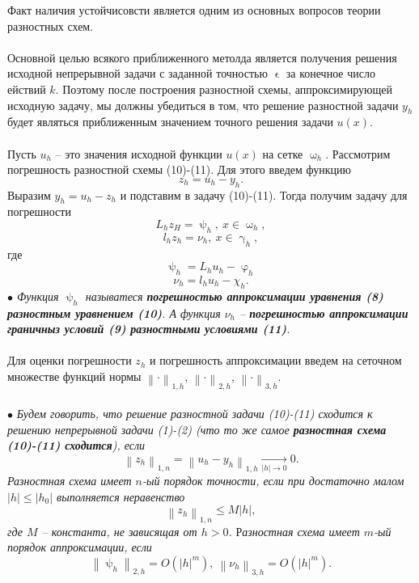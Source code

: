 \documentclass[a4paper, 12pt]{report}
\numberwithin{equation}{section}
\renewcommand{\leq}{\leqslant}
\renewcommand{\gamma}{\upgamma}
\renewcommand{\varphi}{\upvarphi}
\renewcommand{\psi}{\uppsi}
\renewcommand{\omega}{\upomega}
\renewcommand{\epsilon}{\upvarepsilon}
\newcommand\Norm[1]{\left\| #1 \right\|}
\begin{document}
			Факт наличия устойчисовсти является одним из основных вопросов теории разностных схем.\\\\
			Основной целью всякого приближенного метолда является получения решения исходной непрерывной задачи с заданной точностью $\epsilon$ за конечное число ействий $k$. Поэтому после построения разностной схемы, аппроксимирующей исходную задачу, мы должны убедиться в том, что решение разностной задачи $y_h$ будет являться приближенным значением точного решения задачи $u(x)$.\\\\
			Пусть $u_h$  -- это значения исходной функции $u(x)$ на сетке $\omega_h$. Рассмотрим погрешность разностной схемы (10)-(11). Для этого введем функцию $$z_h = u_h - y_h.$$ Выразим $y_h = u_h - z_h$ и подставим в задачу (10)-(11). Тогда получим задачу для погрешности 
			\begin{equation}
			L_h z_H = \psi_h,\ x \in \omega_h,
			\end{equation}
			\begin{equation}
				l_h z_h = \nu_h,\ x \in \gamma_h,
			\end{equation}
			где
			$$\psi_h = L_h u_h - \varphi_h$$
			$$\nu_h = l_hu_h - \chi_h.$$
			\textit{$\bullet$ Функция $\psi_h$ называтеся \textbf{погрешностью аппроксимации уравнения (8) разностным уравнением (10)}. А функция $\nu_h$ -- \textbf{погрешностью аппроксимации граничныз условий (9) разностными условиями (11)}.}\\\\
			Для оценки погрешности $z_h$ и погрешность аппроксимации введем на сеточном множестве функций нормы $\Norm{\cdot}_{1,h}$, $\Norm{\cdot}_{2,h}$, $\Norm{\cdot}_{3,h}$.\\\\
			$\bullet$ \textit{Будем говорить, что решение разностной задачи (10)-(11) сходится к решению непрерывной задачи (1)-(2) (что то же самое \textbf{разностная схема (10)-(11) сходится}), если }
			\begin{equation}
				\Norm{z_h}_{1,n}= \Norm{u_h - y_h}_{1,h} \xrightarrow[|h| \to 0]{}0.
			\end{equation}
			\textit{Разностная схема имеет $n$-ый порядок точности, если при достаточно малом $|h|\leq |h_0|$ выполняется неравенство}
			\begin{equation}
				\Norm{z_h}_{1,n}\leq M|h|,
			\end{equation}
			\textit{где $M$ -- константа, не зависящая от $h>0$.}
			Р\textit{азностная схема имеет $m$-ый порядок аппроксимации, если} \begin{equation}
				\Norm{\psi_h}_{2,h} = O(|h|^m),\ \Norm{\nu_h}_{3,h} = O(|h|^m).
			\end{equation}
\end{document}
